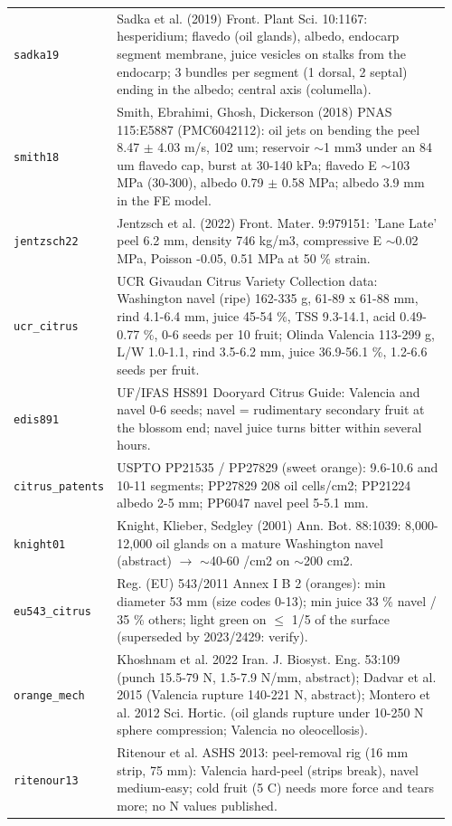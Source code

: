 \documentclass[10.5pt,a4paper]{article}
\begin{document}
{\begin{longtable}{@{}p{0.16\linewidth}p{0.8\linewidth}@{}}
\texttt{sadka19} & Sadka et al. (2019) Front. Plant Sci. 10:1167: hesperidium; flavedo (oil glands), albedo, endocarp segment membrane, juice vesicles on stalks from the endocarp; 3 bundles per segment (1 dorsal, 2 septal) ending in the albedo; central axis (columella). \\
\texttt{smith18} & Smith, Ebrahimi, Ghosh, Dickerson (2018) PNAS 115:E5887 (PMC6042112): oil jets on bending the peel 8.47 $\pm$ 4.03 m/s, 102 um; reservoir $\sim$1 mm3 under an 84 um flavedo cap, burst at 30-140 kPa; flavedo E $\sim$103 MPa (30-300), albedo 0.79 $\pm$ 0.58 MPa; albedo 3.9 mm in the FE model. \\
\texttt{jentzsch22} & Jentzsch et al. (2022) Front. Mater. 9:979151: 'Lane Late' peel 6.2 mm, density 746 kg/m3, compressive E $\sim$0.02 MPa, Poisson -0.05, 0.51 MPa at 50 \% strain. \\
\texttt{ucr\_\allowbreak{}citrus} & UCR Givaudan Citrus Variety Collection data: Washington navel (ripe) 162-335 g, 61-89 x 61-88 mm, rind 4.1-6.4 mm, juice 45-54 \%, TSS 9.3-14.1, acid 0.49-0.77 \%, 0-6 seeds per 10 fruit; Olinda Valencia 113-299 g, L/W 1.0-1.1, rind 3.5-6.2 mm, juice 36.9-56.1 \%, 1.2-6.6 seeds per fruit. \\
\texttt{edis891} & UF/IFAS HS891 Dooryard Citrus Guide: Valencia and navel 0-6 seeds; navel = rudimentary secondary fruit at the blossom end; navel juice turns bitter within several hours. \\
\texttt{citrus\_\allowbreak{}patents} & USPTO PP21535 / PP27829 (sweet orange): 9.6-10.6 and 10-11 segments; PP27829 208 oil cells/cm2; PP21224 albedo 2-5 mm; PP6047 navel peel 5-5.1 mm. \\
\texttt{knight01} & Knight, Klieber, Sedgley (2001) Ann. Bot. 88:1039: 8,000-12,000 oil glands on a mature Washington navel (abstract) $\to$ $\sim$40-60 /cm2 on $\sim$200 cm2. \\
\texttt{eu543\_\allowbreak{}citrus} & Reg. (EU) 543/2011 Annex I B 2 (oranges): min diameter 53 mm (size codes 0-13); min juice 33 \% navel / 35 \% others; light green on $\le$ 1/5 of the surface (superseded by 2023/2429: verify). \\
\texttt{orange\_\allowbreak{}mech} & Khoshnam et al. 2022 Iran. J. Biosyst. Eng. 53:109 (punch 15.5-79 N, 1.5-7.9 N/mm, abstract); Dadvar et al. 2015 (Valencia rupture 140-221 N, abstract); Montero et al. 2012 Sci. Hortic. (oil glands rupture under 10-250 N sphere compression; Valencia no oleocellosis). \\
\texttt{ritenour13} & Ritenour et al. ASHS 2013: peel-removal rig (16 mm strip, 75 mm): Valencia hard-peel (strips break), navel medium-easy; cold fruit (5 C) needs more force and tears more; no N values published. \\

\end{longtable}}
\end{document}

